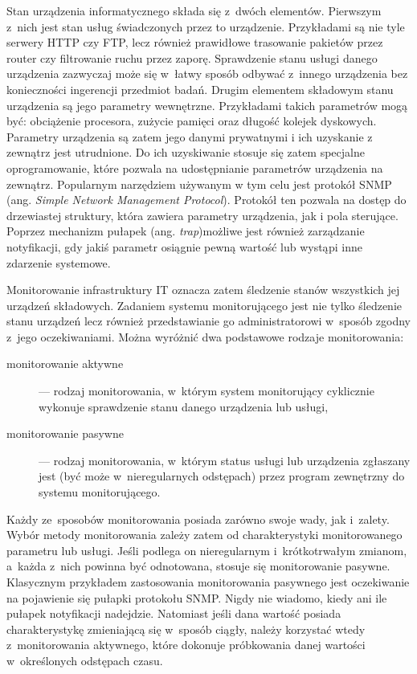 Stan urządzenia informatycznego składa się z~dwóch
elementów. Pierwszym z~nich jest stan usług świadczonych przez to
urządzenie. Przykładami są nie tyle serwery HTTP czy FTP, lecz również
prawidłowe trasowanie pakietów przez router czy filtrowanie ruchu
przez zaporę. Sprawdzenie stanu usługi danego urządzenia zazwyczaj
może się w~łatwy sposób odbywać z~innego urządzenia bez konieczności
ingerencji przedmiot badań. Drugim elementem składowym stanu
urządzenia są jego parametry wewnętrzne. Przykładami takich parametrów
mogą być: obciążenie procesora, zużycie pamięci oraz długość kolejek
dyskowych. Parametry urządzenia są zatem jego danymi prywatnymi i ich
uzyskanie z zewnątrz jest utrudnione. Do ich uzyskiwanie stosuje się
zatem specjalne oprogramowanie, które pozwala na udostępnianie
parametrów urządzenia na zewnątrz. Popularnym narzędziem używanym w
tym celu jest protokół SNMP (ang. {\em Simple Network Management
  Protocol})\cite{www:SNMP}.  Protokół ten pozwala na dostęp do
drzewiastej struktury, która zawiera parametry urządzenia, jak i pola
sterujące. Poprzez mechanizm pułapek (ang. {\em trap})możliwe jest
również zarządzanie notyfikacji, gdy jakiś parametr osiągnie pewną
wartość lub wystąpi inne zdarzenie systemowe.

Monitorowanie infrastruktury IT oznacza zatem śledzenie stanów
wszystkich jej urządzeń składowych. Zadaniem systemu monitorującego
jest nie tylko śledzenie stanu urządzeń lecz również przedstawianie go
administratorowi w~sposób zgodny z~jego oczekiwaniami. Można wyróżnić
dwa podstawowe rodzaje monitorowania:

\begin{description}
\item[monitorowanie aktywne] --- rodzaj monitorowania, w~którym system
  monitorujący cyklicznie wykonuje sprawdzenie stanu danego
  urządzenia lub usługi,
\item[monitorowanie pasywne] --- rodzaj monitorowania, w~którym status
  usługi lub urządzenia zgłaszany jest (być może w~nieregularnych
  odstępach) przez program zewnętrzny do systemu monitorującego.
\end{description}

Każdy ze~sposobów monitorowania posiada zarówno swoje wady, jak
i~zalety. Wybór metody monitorowania zależy zatem od charakterystyki
monitorowanego parametru lub usługi. Jeśli podlega on nieregularnym
i~krótkotrwałym zmianom, a~każda z~nich powinna być odnotowana,
stosuje się monitorowanie pasywne. Klasycznym przykładem zastosowania
monitorowania pasywnego jest oczekiwanie na pojawienie się pułapki
protokołu SNMP. Nigdy nie wiadomo, kiedy ani ile pułapek notyfikacji
nadejdzie. Natomiast jeśli dana wartość posiada charakterystykę
zmieniającą się w~sposób ciągły, należy korzystać wtedy
z~monitorowania aktywnego, które dokonuje próbkowania danej wartości
w~określonych odstępach czasu.

